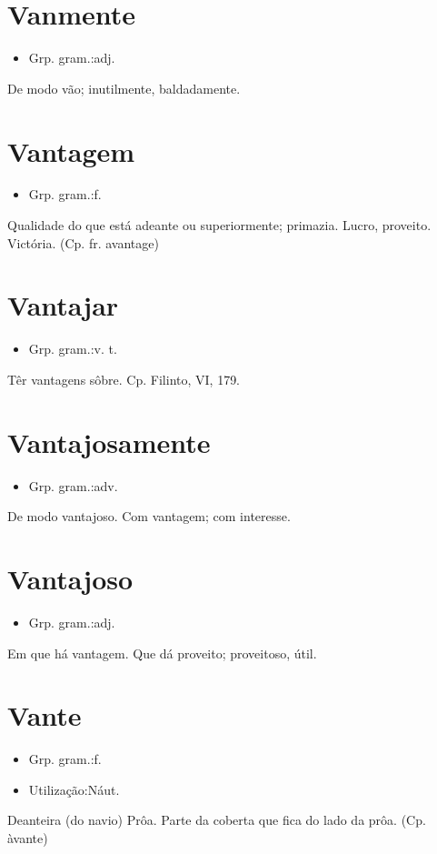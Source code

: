 \documentclass{article}
\begin{document}
\section{Vanmente}
\begin{itemize}
\item {Grp. gram.:adj.}
\end{itemize}
De modo vão; inutilmente, baldadamente.
\section{Vantagem}
\begin{itemize}
\item {Grp. gram.:f.}
\end{itemize}
Qualidade do que está adeante ou superiormente; primazia.
Lucro, proveito.
Victória.
(Cp. fr. \textunderscore avantage\textunderscore )
\section{Vantajar}
\begin{itemize}
\item {Grp. gram.:v. t.}
\end{itemize}
Têr vantagens sôbre. Cp. Filinto, VI, 179.
\section{Vantajosamente}
\begin{itemize}
\item {Grp. gram.:adv.}
\end{itemize}
De modo vantajoso.
Com vantagem; com interesse.
\section{Vantajoso}
\begin{itemize}
\item {Grp. gram.:adj.}
\end{itemize}
Em que há vantagem.
Que dá proveito; proveitoso, útil.
\section{Vante}
\begin{itemize}
\item {Grp. gram.:f.}
\end{itemize}
\begin{itemize}
\item {Utilização:Náut.}
\end{itemize}
Deanteira (do navio)
Prôa.
Parte da coberta que fica do lado da prôa.
(Cp. \textunderscore àvante\textunderscore )
\end{document}
